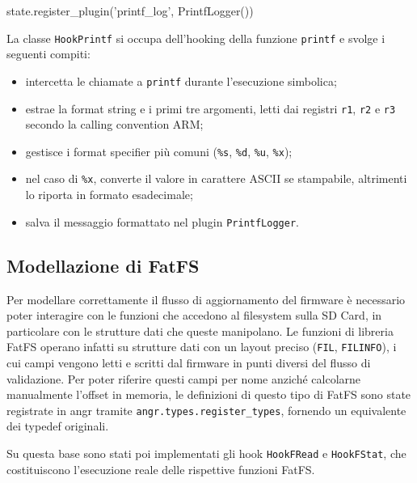 \begin{pythoncode}
state.register_plugin('printf_log', PrintfLogger())
\end{pythoncode}

La classe \texttt{HookPrintf} si occupa dell'hooking della funzione 
\texttt{printf} e svolge i seguenti compiti:

\begin{itemize}[noitemsep]
    \item intercetta le chiamate a \texttt{printf} durante l'esecuzione simbolica;
    \item estrae la format string e i primi tre argomenti, letti dai 
    registri \texttt{r1}, \texttt{r2} e \texttt{r3} secondo la calling 
    convention ARM;
    \item gestisce i format specifier più comuni (\texttt{\%s}, 
    \texttt{\%d}, \texttt{\%u}, \texttt{\%x});
    \item nel caso di \texttt{\%x}, converte il valore in carattere 
    ASCII se stampabile, altrimenti lo riporta in formato esadecimale;
    \item salva il messaggio formattato nel plugin \texttt{PrintfLogger}.
\end{itemize}

    
    
    
    \subsection{Modellazione di FatFS}
    \label{subsec:modellazione_fatfs}
    Per modellare correttamente il flusso di aggiornamento del firmware è necessario poter interagire con le funzioni che accedono al filesystem sulla SD Card, in particolare con le strutture dati che queste manipolano. Le funzioni di libreria FatFS operano infatti su strutture dati con un layout preciso (\texttt{FIL}, \texttt{FILINFO}), i cui campi vengono letti e scritti dal firmware in punti diversi del flusso di validazione. Per poter riferire questi campi per nome anziché calcolarne manualmente l'offset in memoria, le definizioni di questo tipo di FatFS sono state registrate in angr tramite \texttt{angr.types.register\_types}, fornendo un equivalente dei typedef
originali.


        Su questa base sono stati poi implementati gli hook \texttt{HookFRead} e \texttt{HookFStat}, che costituiscono l'esecuzione reale delle rispettive funzioni FatFS.

